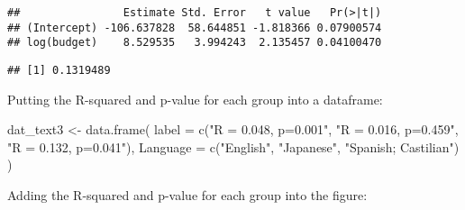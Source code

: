 \documentclass[
]{article}
\newenvironment{Shaded}{\begin{snugshade}}{\end{snugshade}}
\newcommand{\AttributeTok}[1]{\textcolor[rgb]{0.77,0.63,0.00}{#1}}
\newcommand{\DecValTok}[1]{\textcolor[rgb]{0.00,0.00,0.81}{#1}}
\newcommand{\FunctionTok}[1]{\textcolor[rgb]{0.00,0.00,0.00}{#1}}
\newcommand{\NormalTok}[1]{#1}
\newcommand{\OtherTok}[1]{\textcolor[rgb]{0.56,0.35,0.01}{#1}}
\newcommand{\SpecialCharTok}[1]{\textcolor[rgb]{0.00,0.00,0.00}{#1}}
\newcommand{\StringTok}[1]{\textcolor[rgb]{0.31,0.60,0.02}{#1}}
\begin{document}
\begin{Shaded}
\end{Shaded}

\begin{verbatim}
##                Estimate Std. Error   t value   Pr(>|t|)
## (Intercept) -106.637828  58.644851 -1.818366 0.07900574
## log(budget)    8.529535   3.994243  2.135457 0.04100470
\end{verbatim}

\begin{Shaded}
\end{Shaded}

\begin{verbatim}
## [1] 0.1319489
\end{verbatim}

Putting the R-squared and p-value for each group into a dataframe:

\begin{Shaded}
\begin{Highlighting}[]
\NormalTok{dat\_text3 }\OtherTok{\textless{}{-}} \FunctionTok{data.frame}\NormalTok{(}
  \AttributeTok{label =} \FunctionTok{c}\NormalTok{(}\StringTok{"R = 0.048, p=0.001"}\NormalTok{, }\StringTok{"R = 0.016, p=0.459"}\NormalTok{, }\StringTok{"R = 0.132, p=0.041"}\NormalTok{),}
  \AttributeTok{Language   =} \FunctionTok{c}\NormalTok{(}\StringTok{"English"}\NormalTok{, }\StringTok{"Japanese"}\NormalTok{, }\StringTok{"Spanish; Castilian"}\NormalTok{)}
\NormalTok{)}
\end{Highlighting}
\end{Shaded}

Adding the R-squared and p-value for each group into the figure:
\end{document}
